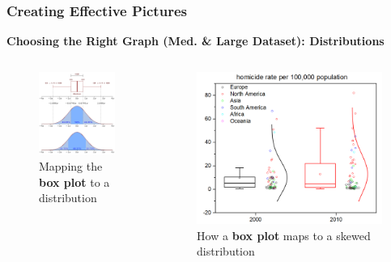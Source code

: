 \documentclass{beamer}
\begin{document}
\begin{frame}
\frametitle{Creating Effective Pictures}
\textbf{Choosing the Right Graph (Med. \& Large Dataset): Distributions}\\
\vspace{0.2cm}
\begin{columns}[b]
\begin{figure}
\includegraphics[scale=0.5]{boxplot_ex}
\caption{Mapping the \textbf{box plot} to a distribution}
\end{figure}
\begin{figure}
\includegraphics[scale=0.35]{Box_scatter}
\caption{How a \textbf{box plot} maps to a skewed distribution}
\end{figure}
\end{columns}
\end{frame}

\end{document}

